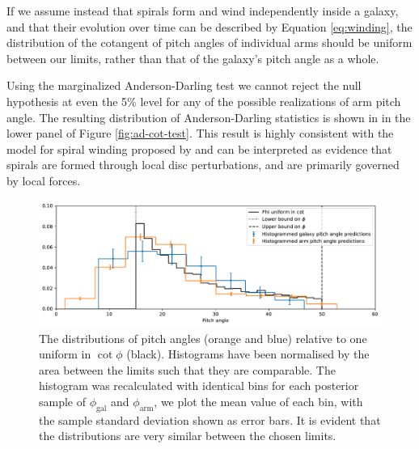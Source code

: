 If we assume instead that spirals form and wind independently inside a galaxy, and that their evolution over time can be described by Equation \ref{eq:winding}, the distribution of the cotangent of pitch angles of individual arms should be uniform between our limits, rather than that of the galaxy's pitch angle as a whole.

Using the marginalized Anderson-Darling test we cannot reject the null hypothesis at even the 5\% level for any of the possible realizations of arm pitch angle. The resulting distribution of Anderson-Darling statistics is shown in in the lower panel of Figure \ref{fig:ad-cot-test}. This result is highly consistent with the model for spiral winding proposed by \citet{2019arXiv190910291P} and can be interpreted as evidence that spirals are formed through local disc perturbations, and are primarily governed by local forces.

\begin{figure}
  \includegraphics[width=17.7cm]{plots/phi_distribution_comparison.pdf}
  \caption{The distributions of pitch angles (orange and blue) relative to one uniform in $\cot\phi$ (black). Histograms have been normalised by the area between the limits such that they are comparable. The histogram was recalculated with identical bins for each posterior sample of $\phi_\mathrm{gal}$ and $\phi_\mathrm{arm}$, we plot the mean value of each bin, with the sample standard deviation shown as error bars. It is evident that the distributions are very similar between the chosen limits.}
  \label{fig:pa-cot-distributions}
\end{figure}


